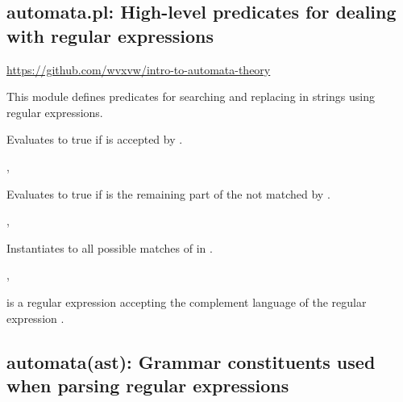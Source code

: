 


\subsection{automata.pl: High-level predicates for dealing with regular expressions}

\label{sec:automata}

\begin{tags}
\url{https://github.com/wvxvw/intro-to-automata-theory}
\end{tags}

This module defines predicates for searching and replacing in strings
using regular expressions.\vspace{0.7cm}

\begin{description}
Evaluates to true if  is accepted by .

\begin{tags}
, 
\end{tags}

Evaluates to true if  is the remaining part of the 
not matched by .

\begin{tags}
, 
\end{tags}

Instantiates  to all possible matches of  in .

\begin{tags}
, 
\end{tags}

 is a regular expression accepting the complement language
of the regular expression .
\end{description}

\subsection{automata(ast): Grammar constituents used when parsing regular expressions}

